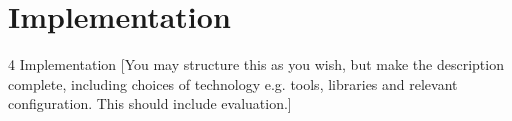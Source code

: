 \clearpage
\section{Implementation}

4 Implementation
[You may structure this as you wish, but make the description complete, including choices of
technology e.g. tools, libraries and relevant configuration. This should include evaluation.]